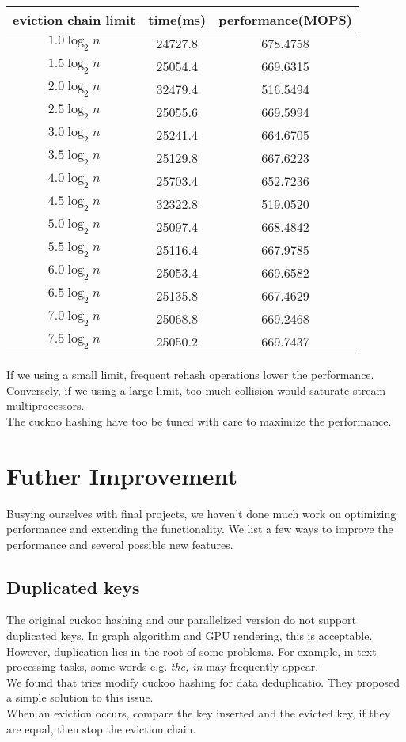 \documentclass{article}
\newcommand{\reportSection}[1]{
   \pagebreak
   \section{#1}
   \chead{section \emph{#1}}
}
\begin{document}
\begin{tabular}{|c|c|c|}
	\hline
	eviction chain limit & time(ms) & performance(MOPS) \\
	\hline
	$1.0 \log_2 n$       & 24727.8  & 678.4758          \\
	$1.5 \log_2 n$       & 25054.4  & 669.6315          \\
	$2.0 \log_2 n$       & 32479.4  & 516.5494          \\
	$2.5 \log_2 n$       & 25055.6  & 669.5994          \\
	$3.0 \log_2 n$       & 25241.4  & 664.6705          \\
	$3.5 \log_2 n$       & 25129.8  & 667.6223          \\
	$4.0 \log_2 n$       & 25703.4  & 652.7236          \\
	$4.5 \log_2 n$       & 32322.8  & 519.0520          \\
	$5.0 \log_2 n$       & 25097.4  & 668.4842          \\
	$5.5 \log_2 n$       & 25116.4  & 667.9785          \\
	$6.0 \log_2 n$       & 25053.4  & 669.6582          \\
	$6.5 \log_2 n$       & 25135.8  & 667.4629          \\
	$7.0 \log_2 n$       & 25068.8  & 669.2468          \\
	$7.5 \log_2 n$       & 25050.2  & 669.7437          \\
	\hline
\end{tabular}

If we using a small limit, frequent rehash operations lower the performance.
Conversely, if we using a large limit, too much collision would saturate stream multiprocessors.\\
The cuckoo hashing have too be tuned with care to maximize the performance.

\reportSection{Futher Improvement}

Busying ourselves with final projects, we haven't done much work on optimizing performance and extending the functionality.
We list a few ways to improve the performance and several possible new features.

\subsection{Duplicated keys}

The original cuckoo hashing and our parallelized version do not support duplicated keys.
In graph algorithm and GPU rendering, this is acceptable.
However, duplication lies in the root of some problems. For example, in text processing tasks, some words e.g. \textit{the, in} may frequently appear.\\
We found that {}\cite{paper:deduphash} tries modify cuckoo hashing for data deduplicatio. They proposed a simple solution to this issue.\\
When an eviction occurs, compare the key inserted and the evicted key, if they are equal, then stop the eviction chain.
\end{document}
